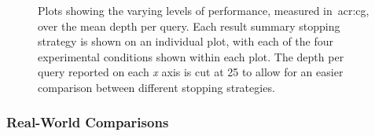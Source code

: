 \begin{figure}[t!]
    \centering
    \caption[Performance plots (diversification)]{Plots showing the varying levels of performance, measured in~\gls{acr:cg}, over the mean depth per query. Each result summary stopping strategy is shown on an individual plot, with each of the four experimental conditions shown within each plot. The depth per query reported on each \emph{x} axis is cut at 25 to allow for an easier comparison between different stopping strategies.}
    \label{fig:ch8_sim_perf_plots}
\end{figure}

\subsubsection{Real-World Comparisons}

